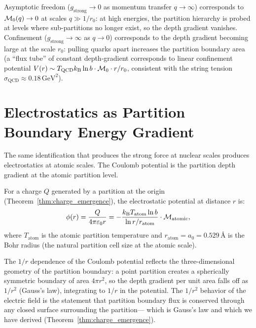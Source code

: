 \begin{remark}
Asymptotic freedom ($g_{\mathrm{strong}} \to 0$ as momentum transfer $q \to \infty$)
corresponds to $\mathcal{M}_0(q) \to 0$ at scales $q \gg 1/r_0$: at high energies,
the partition hierarchy is probed at levels where sub-partitions no longer
exist, so the depth gradient vanishes. Confinement ($g_{\mathrm{strong}} \to \infty$
as $q \to 0$) corresponds to the depth gradient becoming large at the scale $r_0$:
pulling quarks apart increases the partition boundary area (a ``flux tube'' of
constant depth-gradient corresponds to linear confinement potential
$V(r) \sim T_{\mathrm{QCD}} k_{\mathrm{B}} \ln b \cdot \mathcal{M}_0 \cdot r / r_0$,
consistent with the string tension $\sigma_{\mathrm{QCD}} \approx 0.18\,\mathrm{GeV}^2$).
\end{remark}

\section{Electrostatics as Partition Boundary Energy Gradient}
\label{sec:electrostatics_gradient}

The same identification that produces the strong force at nuclear scales
produces electrostatics at atomic scales. The Coulomb potential is the
partition depth gradient at the atomic partition level.

\begin{proposition}
\label{prop:coulomb_depth}
For a charge $Q$ generated by a partition at the origin
(Theorem~\ref{thm:charge_emergence}), the electrostatic potential at
distance $r$ is:
\begin{equation}
  \phi(r) = \frac{Q}{4\pi\varepsilon_0 r} = -\frac{k_{\mathrm{B}} T_{\mathrm{atom}} \ln b}{\ln r / r_{\mathrm{atom}}} \cdot \mathcal{M}_{\mathrm{atomic}},
  \label{eq:coulomb_depth}
\end{equation}
where $T_{\mathrm{atom}}$ is the atomic partition temperature and
$r_{\mathrm{atom}} = a_0 = 0.529\,\text{\AA}$ is the Bohr radius (the natural
partition cell size at the atomic scale).
\end{proposition}

The $1/r$ dependence of the Coulomb potential reflects the three-dimensional
geometry of the partition boundary: a point partition creates a spherically
symmetric boundary of area $4\pi r^2$, so the depth gradient per unit area
falls off as $1/r^2$ (Gauss's law), integrating to $1/r$ in the potential.
The $1/r^2$ behavior of the electric field is the statement that partition
boundary flux is conserved through any closed surface surrounding the partition---
which is Gauss's law and which we have derived (Theorem~\ref{thm:charge_emergence}).


